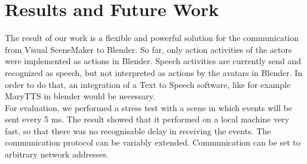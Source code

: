 \documentclass[
10pt, %
a4paper, %
oneside,
headinclude,footinclude, %
BCOR5mm, %
]{scrartcl}
\begin{document}

\section{Results and Future Work}
The result of our work is a flexible and powerful solution for the  communication from Visual SceneMaker to Blender. So far, only action activities of the actors were implemented as actions in Blender. Speech activities are currently send and recognized as speech, but not interpreted as actions by the avatars in Blender. In order to do that, an integration of a Text to Speech software, like for example MaryTTS in blender would be necessary. \\
For evaluation, we performed a stress test with a scene in which events will be sent every 5 ms. The result showed that it performed on a local machine very fast, so that there was no recognisable delay in receiving the events. The communication protocol can be variably extended. Communication can be set to arbitrary network addresses.
\end{document}
